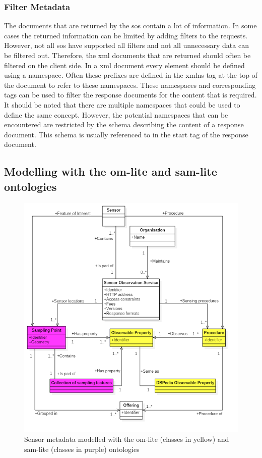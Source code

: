 \subsubsection{Filter Metadata}

The documents that are returned by the \ac{sos} contain a lot of information. In some cases the returned information can be limited by adding filters to the requests. However, not all \ac{sos} have supported all filters and not all unnecessary data can be filtered out. Therefore, the \ac{xml} documents that are returned should often be filtered on the client side. In a \ac{xml} document every element should be defined using a namespace. Often these prefixes are defined in the xmlns tag at the top of the document to refer to these namespaces. These namespaces and corresponding tags can be used to filter the response documents for the content that is required. It should be noted that there are multiple namespaces that could be used to define the same concept. However, the potential namespaces that can be encountered are restricted by the schema describing the content of a response document. This schema is usually referenced to in the start tag of the response document.


\subsection{Modelling with the om-lite and sam-lite ontologies}
\begin{figure}
	\centering
	\includegraphics[width=1\linewidth]{UML/SOS_Semantic_UML_2.PNG}
	\caption{Sensor metadata modelled with the om-lite (classes in yellow) and sam-lite (classes in purple) ontologies}
	\label{fig:SOS_Semantic_UML}
\end{figure}

